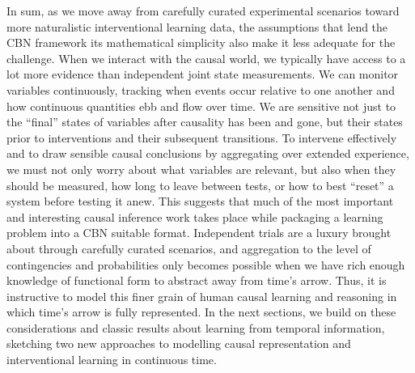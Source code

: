 \documentclass{cambridge7A}%
\begin{document}
In sum, as we move away from carefully curated experimental scenarios toward more naturalistic interventional learning data, the assumptions that lend the CBN framework its mathematical simplicity also make it less adequate for the challenge.  %
When we interact with the causal world, we typically have access to a lot more evidence than independent joint state measurements.  We can monitor variables continuously, tracking when events occur relative to one another and how continuous quantities ebb and flow over time.  We are sensitive not just to the ``final'' states of variables after causality has been and gone, but their states prior to interventions and their subsequent transitions.  To intervene effectively and to draw sensible causal conclusions by aggregating over extended experience, we must not only worry about what variables are relevant, but also when they should be measured, how long to leave between tests, or how to best ``reset'' a system before testing it anew.  
This suggests that much of the most important and interesting causal inference work takes place while packaging a learning problem into a CBN suitable format.  Independent trials are a luxury brought about through carefully curated scenarios, and aggregation to the level of contingencies and probabilities only becomes possible when we have rich enough knowledge of functional form to abstract away from time's arrow.  Thus, it is instructive to model this finer grain of human causal learning and reasoning in which time's arrow is fully represented.     %
In the next sections, we build on these considerations and classic results about learning from temporal information, sketching two new approaches to modelling causal representation and interventional learning in continuous time.
\end{document}
